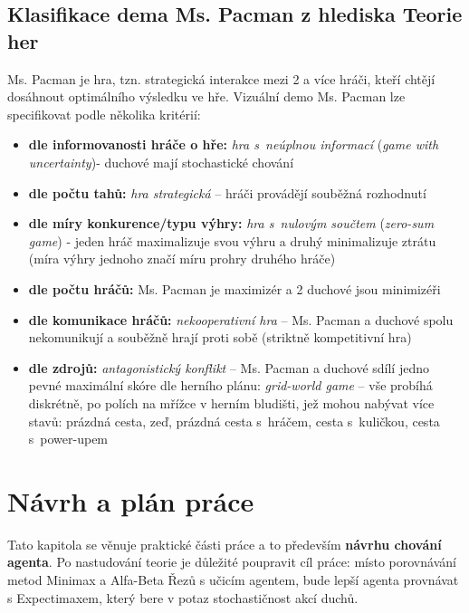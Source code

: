 \section{Klasifikace dema Ms. Pacman z hlediska Teorie her}
Ms. Pacman je hra, tzn. strategická interakce mezi 2 a více hráči, kteří chtějí dosáhnout optimálního výsledku ve hře.
Vizuální demo Ms. Pacman lze specifikovat podle několika kritérií:
\begin{itemize}
\item \textbf{dle informovanosti hráče o hře:} \textit{hra s neúplnou informací} (\textit{game with uncertainty})- duchové mají stochastické chování
\item \textbf{dle počtu tahů:} \textit{hra strategická} – hráči provádějí souběžná rozhodnutí
\item \textbf{dle míry konkurence/typu výhry:} \textit{hra s nulovým součtem} (\textit{zero-sum game})  - jeden hráč maximalizuje svou výhru a druhý minimalizuje ztrátu (míra výhry jednoho značí míru prohry druhého hráče)
\item \textbf{dle počtu hráčů:} Ms. Pacman je maximizér a 2 duchové jsou minimizéři
\item \textbf{dle komunikace hráčů:} \textit{nekooperativní hra} – Ms. Pacman a duchové spolu nekomunikují a souběžně hrají proti sobě (striktně kompetitivní hra)
\item \textbf{dle zdrojů:} \textit{antagonistický konflikt} – Ms. Pacman a duchové sdílí jedno pevné maximální skóre
dle herního plánu: \textit{grid-world game} – vše probíhá diskrétně, po polích na mřížce v herním bludišti, jež mohou nabývat více stavů: prázdná cesta, zeď, prázdná cesta s hráčem, cesta s kuličkou, cesta s power-upem
\end{itemize}
\chapter{Návrh a plán práce}
Tato kapitola se věnuje praktické části práce a to především \textbf{návrhu chování agenta}. Po nastudování teorie je důležité poupravit cíl práce: místo porovnávání metod Minimax a Alfa-Beta Řezů s učicím agentem, bude lepší agenta provnávat s Expectimaxem, který bere v potaz stochastičnost akcí duchů.
